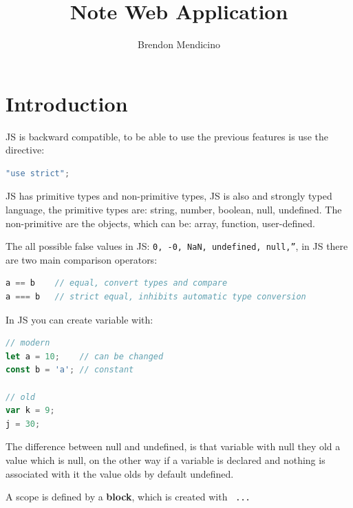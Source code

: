 \documentclass[12pt]{article}
\title{Note Web Application}
\author{Brendon Mendicino}
\begin{document}
\maketitle
\newpage
\tableofcontents
\newpage



\section{ Introduction}
JS is backward compatible, to be able to use the previous features is use the directive:
\begin{lstlisting}[language=js]
"use strict";
\end{lstlisting}
JS has primitive types and non-primitive types, JS is also and strongly typed language, the primitive types are: string, number, boolean, null, undefined. The non-primitive are the objects, which can be: array, function, user-defined.

The all possible false values in JS: \texttt{0, -0, NaN, undefined, null,''}, in JS there are two main comparison operators:
\begin{lstlisting}[language=js]
a == b    // equal, convert types and compare
a === b   // strict equal, inhibits automatic type conversion
\end{lstlisting}
In JS you can create variable with:
\begin{lstlisting}[language=js]
// modern
let a = 10;    // can be changed
const b = 'a'; // constant

// old
var k = 9;
j = 30;
\end{lstlisting}
The difference between null and undefined, is that variable with null they old a value which is null, on the other way if a variable is declared and nothing is associated with it the value olds by default undefined.

A scope is defined by a \textbf{block}, which is created with \texttt{{ ... }}
\end{document}
